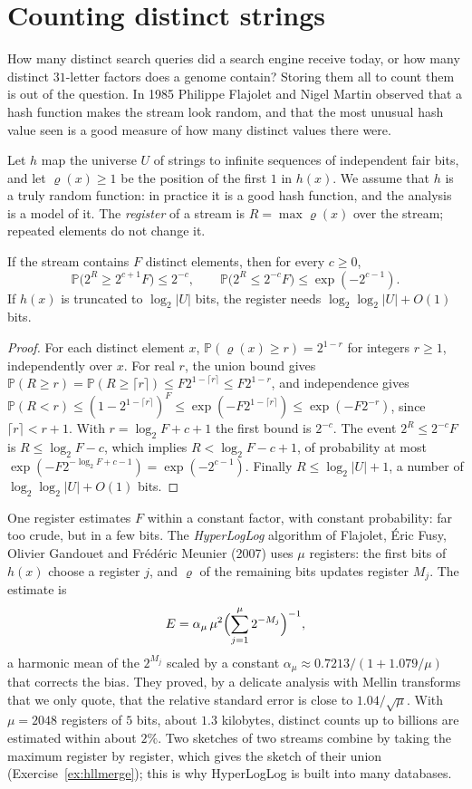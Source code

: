 \section{Counting distinct strings}\label{sec:hll}

How many distinct search queries did a search engine receive today, or how many distinct $31$-letter factors does a genome contain? Storing them all to count them is out of the question. In 1985 Philippe Flajolet and Nigel Martin observed that a hash function makes the stream look random, and that the most unusual hash value seen is a good measure of how many distinct values there were.

Let $h$ map the universe $U$ of strings to infinite sequences of independent fair bits, and let $\varrho(x)\ge1$ be the position of the first $1$ in $h(x)$. We assume that $h$ is a truly random function: in practice it is a good hash function, and the analysis is a model of it. The \emph{register} of a stream is $R=\max\varrho(x)$ over the stream; repeated elements do not change it.

\begin{proposition}\label{prop:fmregister}
If the stream contains $F$ distinct elements, then for every $c\ge0$,
\[
\mathbb P\bigl(2^R\ge2^{c+1}F\bigr)\le2^{-c},\qquad\mathbb P\bigl(2^R\le2^{-c}F\bigr)\le\exp(-2^{c-1}).
\]
If $h(x)$ is truncated to $\log_2|U|$ bits, the register needs $\log_2\log_2|U|+O(1)$ bits.
\end{proposition}
\begin{proof}
For each distinct element $x$, $\mathbb P(\varrho(x)\ge r)=2^{1-r}$ for integers $r\ge1$, independently over $x$. For real $r$, the union bound gives $\mathbb P(R\ge r)=\mathbb P(R\ge\lceil r\rceil)\le F2^{1-\lceil r\rceil}\le F2^{1-r}$, and independence gives $\mathbb P(R<r)\le(1-2^{1-\lceil r\rceil})^F\le\exp(-F2^{1-\lceil r\rceil})\le\exp(-F2^{-r})$, since $\lceil r\rceil<r+1$.
With $r=\log_2F+c+1$ the first bound is $2^{-c}$. The event $2^R\le2^{-c}F$ is $R\le\log_2F-c$, which implies $R<\log_2F-c+1$, of probability at most $\exp(-F2^{-\log_2F+c-1})=\exp(-2^{c-1})$. Finally $R\le\log_2|U|+1$, a number of $\log_2\log_2|U|+O(1)$ bits.
\end{proof}

One register estimates $F$ within a constant factor, with constant probability: far too crude, but in a few bits. The \emph{HyperLogLog} algorithm of Flajolet, \'Eric Fusy, Olivier Gandouet and Fr\'ed\'eric Meunier (2007) uses $\mu$ registers: the first bits of $h(x)$ choose a register $j$, and $\varrho$ of the remaining bits updates register $M_j$. The estimate is
\[
E=\alpha_\mu\,\mu^2\Bigl(\sum_{j=1}^\mu2^{-M_j}\Bigr)^{-1},
\]
a harmonic mean of the $2^{M_j}$ scaled by a constant $\alpha_\mu\approx0.7213/(1+1.079/\mu)$ that corrects the bias. They proved, by a delicate analysis with Mellin transforms that we only quote, that the relative standard error is close to $1.04/\sqrt\mu$. With $\mu=2048$ registers of $5$ bits, about $1.3$ kilobytes, distinct counts up to billions are estimated within about $2\%$. Two sketches of two streams combine by taking the maximum register by register, which gives the sketch of their union (Exercise~\ref{ex:hllmerge}); this is why HyperLogLog is built into many databases.


